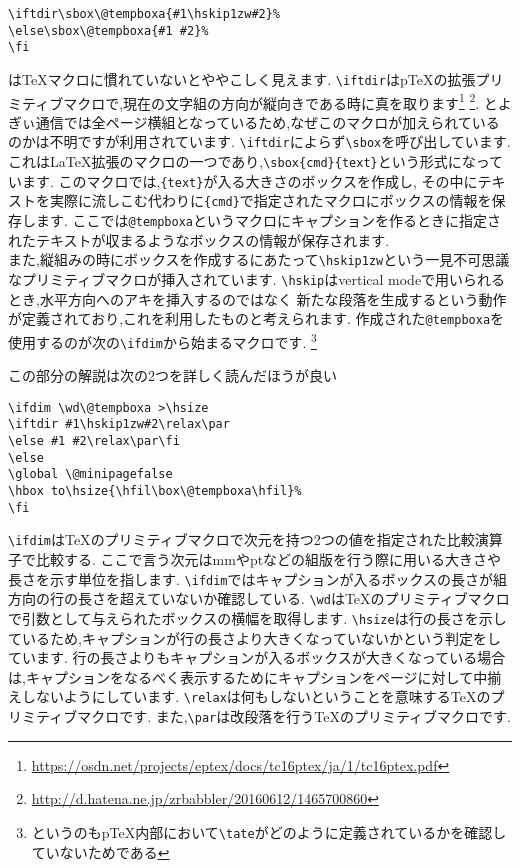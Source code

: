 \begin{verbatim}
\iftdir\sbox\@tempboxa{#1\hskip1zw#2}%
\else\sbox\@tempboxa{#1 #2}%
\fi
\end{verbatim}%
は{\TeX}マクロに慣れていないとややこしく見えます.
\verb|\iftdir|は{p\TeX}の拡張プリミティブマクロで,現在の文字組の方向が縦向きである時に真を取ります\footnote{\url{https://osdn.net/projects/eptex/docs/tc16ptex/ja/1/tc16ptex.pdf}}
\footnote{\url{http://d.hatena.ne.jp/zrbabbler/20160612/1465700860}}.
とよぎぃ通信では全ページ横組となっているため,なぜこのマクロが加えられているのかは不明ですが利用されています.
\verb|\iftdir|によらず\verb|\sbox|を呼び出しています.
これは{\LaTeX}拡張のマクロの一つであり,\verb|\sbox{cmd}{text}|という形式になっています.
このマクロでは,\verb|{text}|が入る大きさのボックスを作成し,
その中にテキストを実際に流しこむ代わりに\verb|{cmd}|で指定されたマクロにボックスの情報を保存します.
ここでは\verb|@tempboxa|というマクロにキャプションを作るときに指定されたテキストが収まるようなボックスの情報が保存されます.\\
また,縦組みの時にボックスを作成するにあたって\verb|\hskip1zw|という一見不可思議なプリミティブマクロが挿入されています.
\verb|\hskip|はvertical modeで用いられるとき,水平方向へのアキを挿入するのではなく
新たな段落を生成するという動作が定義されており,これを利用したものと考えられます.
作成された\verb|@tempboxa|を使用するのが次の\verb|\ifdim|から始まるマクロです.
\footnote{というのも{p\TeX}内部において\texttt{\textbackslash{}tate}がどのように定義されているかを確認していないためである}

この部分の解説は次の2つを詳しく読んだほうが良い
\begin{verbatim}
\ifdim \wd\@tempboxa >\hsize
\iftdir #1\hskip1zw#2\relax\par
\else #1 #2\relax\par\fi
\else
\global \@minipagefalse
\hbox to\hsize{\hfil\box\@tempboxa\hfil}%
\fi
\end{verbatim}
\verb|\ifdim|は{\TeX}のプリミティブマクロで次元を持つ2つの値を指定された比較演算子で比較する.
ここで言う次元はmmやptなどの組版を行う際に用いる大きさや長さを示す単位を指します.
\verb|\ifdim|ではキャプションが入るボックスの長さが組方向の行の長さを超えていないか確認している.
\verb|\wd|は{\TeX}のプリミティブマクロで引数として与えられたボックスの横幅を取得します.
\verb|\hsize|は行の長さを示しているため,キャプションが行の長さより大きくなっていないかという判定をしています.
行の長さよりもキャプションが入るボックスが大きくなっている場合は,キャプションをなるべく表示するためにキャプションをページに対して中揃えしないようにしています.
\verb|\relax|は何もしないということを意味する{\TeX}のプリミティブマクロです.
また,\verb|\par|は改段落を行う{\TeX}のプリミティブマクロです.

